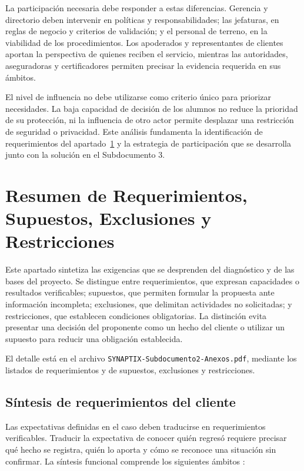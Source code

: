 La participación necesaria debe responder a estas diferencias. Gerencia y directorio deben intervenir en políticas y responsabilidades; las jefaturas, en reglas de negocio y criterios de validación; y el personal de terreno, en la viabilidad de los procedimientos. Los apoderados y representantes de clientes aportan la perspectiva de quienes reciben el servicio, mientras las autoridades, aseguradoras y certificadores permiten precisar la evidencia requerida en sus ámbitos.

El nivel de influencia no debe utilizarse como criterio único para priorizar necesidades. La baja capacidad de decisión de los alumnos no reduce la prioridad de su protección, ni la influencia de otro actor permite desplazar una restricción de seguridad o privacidad. Este análisis fundamenta la identificación de requerimientos del apartado~\ref{sec:requerimientos_supuestos} y la estrategia de participación que se desarrolla junto con la solución en el Subdocumento 3.


\newpage
\section{Resumen de Requerimientos, Supuestos, Exclusiones y Restricciones} %
\label{sec:requerimientos_supuestos}

Este apartado sintetiza las exigencias que se desprenden del diagnóstico y de las bases del proyecto. Se distingue entre requerimientos, que expresan capacidades o resultados verificables; supuestos, que permiten formular la propuesta ante información incompleta; exclusiones, que delimitan actividades no solicitadas; y restricciones, que establecen condiciones obligatorias. La distinción evita presentar una decisión del proponente como un hecho del cliente o utilizar un supuesto para reducir una obligación establecida.

El detalle está en el archivo \texttt{SYNAPTIX-Subdocumento2-Anexos.pdf}, mediante los listados de requerimientos y de supuestos, exclusiones y restricciones.

\subsection{Síntesis de requerimientos del cliente} %

Las expectativas definidas en el caso deben traducirse en requerimientos verificables. Traducir la expectativa de conocer quién regresó requiere precisar qué hecho se registra, quién lo aporta y cómo se reconoce una situación sin confirmar. La síntesis funcional comprende los siguientes ámbitos \parencite[cap.~9, pp.~24-25; cap.~15, RT-16.30, p.~35 y RT-17.01, p.~36; cap.~18, pp.~44-45]{pucv-caso07-2026}:

